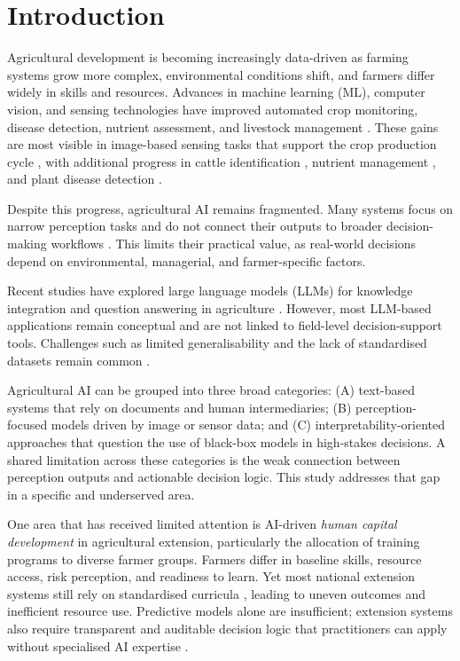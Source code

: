 \documentclass[3p,twocolumn,authoryear]{elsarticle}
\begin{document}

\section{Introduction}

Agricultural development is becoming increasingly data-driven as farming systems
grow more complex, environmental conditions shift, and farmers differ widely in
skills and resources. Advances in machine learning (ML), computer vision, and
sensing technologies have improved automated crop monitoring, disease detection,
nutrient assessment, and livestock management \citep{kamilaris2018,liakos2018,
ghazal2024survey,yang2025}. These gains are most visible in image-based sensing
tasks that support the crop production cycle \citep{ghazal2024survey}, with
additional progress in cattle identification \citep{hossain2022cattle}, nutrient
management \citep{ennaji2023nutrient}, and plant disease detection
\citep{omaye2024disease}.

Despite this progress, agricultural AI remains fragmented. Many systems focus on
narrow perception tasks and do not connect their outputs to broader
decision-making workflows \citep{ghazal2024survey,omaye2024disease}. This limits
their practical value, as real-world decisions depend on environmental,
managerial, and farmer-specific factors.

Recent studies have explored large language models (LLMs) for knowledge
integration and question answering in agriculture \citep{li2025llm}. However,
most LLM-based applications remain conceptual and are not linked to field-level
decision-support tools. Challenges such as limited generalisability and the lack
of standardised datasets remain common \citep{hossain2022cattle,
ennaji2023nutrient}.

Agricultural AI can be grouped into three broad categories: (A) text-based
systems that rely on documents and human intermediaries; (B) perception-focused
models driven by image or sensor data; and (C) interpretability-oriented
approaches that question the use of black-box models in high-stakes decisions.
A shared limitation across these categories is the weak connection between
perception outputs and actionable decision logic. This study addresses that gap
in a specific and underserved area.

One area that has received limited attention is AI-driven \textit{human capital
development} in agricultural extension, particularly the allocation of training
programs to diverse farmer groups. Farmers differ in baseline skills, resource
access, risk perception, and readiness to learn. Yet most national extension
systems still rely on standardised curricula \citep{anderson2004,feder1985},
leading to uneven outcomes and inefficient resource use. Predictive models alone
are insufficient; extension systems also require transparent and auditable
decision logic that practitioners can apply without specialised AI expertise
\citep{arrieta2020,lundberg2020}.
\end{document}
